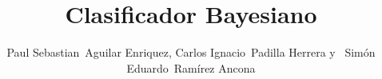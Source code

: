 \documentclass[10pt,journal,compsoc]{IEEEtran}\usepackage[T1]{fontenc}                              %
\begin{document}
%
\title{Clasificador Bayesiano}
%
%
%
%

\author{Paul Sebastian~Aguilar Enriquez,
        Carlos Ignacio~Padilla Herrera
        y ~Simón Eduardo~Ramírez Ancona%
}

% 
%
\end{document}
